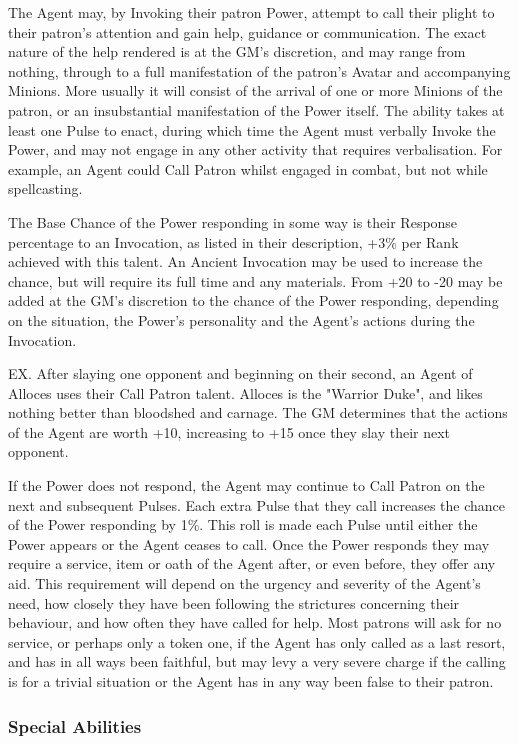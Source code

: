 The Agent may, by Invoking their patron Power, attempt to call their
plight to their patron's attention and gain help, guidance or
communication.  The exact nature of the help rendered is at the GM's
discretion, and may range from nothing, through to a full
manifestation of the patron's Avatar and accompanying Minions.  More
usually it will consist of the arrival of one or more Minions of the
patron, or an insubstantial manifestation of the Power itself.  The
ability takes at least one Pulse to enact, during which time the Agent
must verbally Invoke the Power, and may not engage in any other
activity that requires verbalisation.  For example, an Agent could
Call Patron whilst engaged in combat, but not while spellcasting.

The Base Chance of the Power responding in some way is their Response
percentage to an Invocation, as listed in their description, +3\% per
Rank achieved with this talent. An Ancient Invocation may be used to
increase the chance, but will require its full time and any materials.
From +20 to -20 may be added at the GM's discretion to the chance of
the Power responding, depending on the situation, the Power's
personality and the Agent's actions during the Invocation.

EX. After slaying one opponent and beginning on their second, an Agent
of Alloces uses their Call Patron talent.  Alloces is the "Warrior
Duke", and likes nothing better than bloodshed and carnage.  The GM
determines that the actions of the Agent are worth +10, increasing to
+15 once they slay their next opponent.

If the Power does not respond, the Agent may continue to Call Patron
on the next and subsequent Pulses. Each extra Pulse that they call
increases the chance of the Power responding by 1\%.  This roll is made
each Pulse until either the Power appears or the Agent ceases to call.
Once the Power responds they may require a service, item or oath of
the Agent after, or even before, they offer any aid.  This requirement
will depend on the urgency and severity of the Agent's need, how
closely they have been following the strictures concerning their
behaviour, and how often they have called for help.  Most patrons will
ask for no service, or perhaps only a token one, if the Agent has only
called as a last resort, and has in all ways been faithful, but may
levy a very severe charge if the calling is for a trivial situation or
the Agent has in any way been false to their patron.

\subsubsection{Special Abilities}

